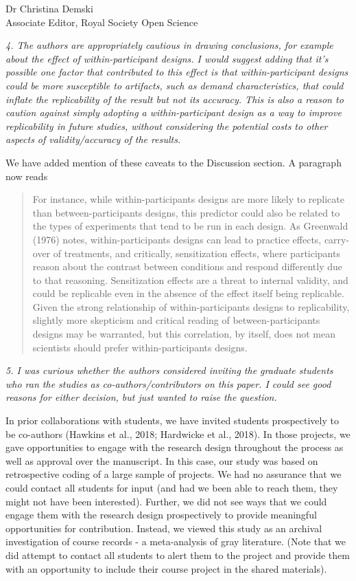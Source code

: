 \documentclass{stanfordletter}
\newcommand{\theysaid}[1]{\begin{leftbar} \noindent 
		\textsl{ #1}\end{leftbar}}
\newcommand{\revised}[1]{\begin{quote}	#1 \end{quote}}
\begin{document}
\begin{letter}{Dr Christina Demski \\ Associate Editor, Royal Society Open Science}
          
          \theysaid{
          	4. The authors are appropriately cautious in drawing conclusions, for example about the effect of within-participant designs.  I would suggest adding that it's possible one factor that contributed to this effect is that within-participant designs could be more susceptible to artifacts, such as demand characteristics, that could inflate the replicability of the result but not its accuracy.  This is also a reason to caution against simply adopting a within-participant design as a way to improve replicability in future studies, without considering the potential costs to other aspects of validity/accuracy of the results.
          }
          
          We have added mention of these caveats to the Discussion section. A paragraph now reads
          
          \revised{For instance, while within-participants designs are more likely to replicate than between-participants designs, this predictor could also be related to the types of experiments that tend to be run in each design. As Greenwald (1976) notes, within-participants designs can lead to practice effects, carry-over of treatments, and critically, sensitization effects, where participants reason about the contrast between conditions and respond differently due to that reasoning. Sensitization effects are a threat to internal validity, and could be replicable even in the absence of the effect itself being replicable.  Given the strong relationship of within-participants designs to replicability, slightly more skepticism and critical reading of between-participants designs may be warranted, but this correlation, by itself, does not mean scientists should prefer within-participants designs.}
          
          \theysaid{
          	5. I was curious whether the authors considered inviting the graduate students who ran the studies as co-authors/contributors on this paper. I could see good reasons for either decision, but just wanted to raise the question.
          }
          
          In prior collaborations with students, we have invited students prospectively to be co-authors (Hawkins et al., 2018; Hardwicke et al., 2018). In those projects, we gave opportunities to engage with the research design throughout the process as well as approval over the manuscript. In this case, our study was based on retrospective coding of a large sample of projects. We had no assurance that we could contact all students for input (and had we been able to reach them, they might not have been interested). Further, we did not see ways that we could engage them with the research design prospectively to provide meaningful opportunities for contribution. Instead, we viewed this study as an archival investigation of course records - a meta-analysis of gray literature. (Note that we did attempt to contact all students to alert them to the project and provide them with an opportunity to include their course project in the shared materials).
          

\end{letter}
\end{document}
